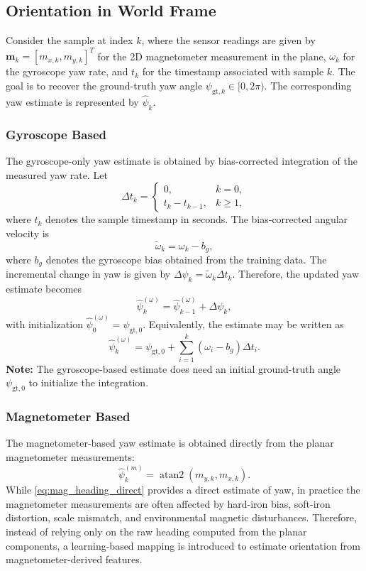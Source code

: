 \documentclass[subscriptcorrection,upint,varvw,barcolor=Goldenrod3,mathalfa=cal=euler,balance,hyphenate,pdf-a]{asmejour}
\begin{document}
\subsection{Orientation in World Frame}
Consider the sample at index $k$, where the sensor readings are given by $\mathbf{m}_k = [m_{x,k}, m_{y,k}]^T$ for the 2D magnetometer measurement in the plane, $\omega_k$ for the gyroscope yaw rate, and $t_k$ for the timestamp associated with sample $k$. The goal is to recover the ground-truth yaw angle $\psi_{\mathrm{gt},k} \in [0,2\pi)$. The corresponding yaw estimate is represented by $\hat{\psi}_k$.

\subsubsection{Gyroscope Based}
The gyroscope-only yaw estimate is obtained by bias-corrected integration of the measured yaw rate. Let
\begin{equation}
\Delta t_k =
\begin{cases}
0, & k=0,\\
t_k - t_{k-1}, & k\ge 1,
\end{cases}
\end{equation}
where \(t_k\) denotes the sample timestamp in seconds. The bias-corrected angular velocity is
\begin{equation}
\tilde{\omega}_k = \omega_k - b_g,
\end{equation}
where \(b_g\) denotes the gyroscope bias obtained from the training data. The incremental change in yaw is given by \(\Delta \psi_k = \tilde{\omega}_k \Delta t_k\).
Therefore, the updated yaw estimate becomes
\begin{equation}
\hat{\psi}^{(\omega)}_k
=
\hat{\psi}^{(\omega)}_{k-1} + \Delta \psi_k,
\end{equation}
with initialization $\hat{\psi}^{(\omega)}_0 = \psi_{\mathrm{gt},0}$.
Equivalently, the estimate may be written as
\begin{equation}
\hat{\psi}^{(\omega)}_k
=
\psi_{\mathrm{gt},0} + \sum_{i=1}^{k} (\omega_i - b_g)\Delta t_i.
\end{equation}
\textbf{Note:} The gyroscope-based estimate does need an initial ground-truth angle $\psi_{\mathrm{gt},0}$ to initialize the integration.

\subsubsection{Magnetometer Based}
The magnetometer-based yaw estimate is obtained directly from the planar magnetometer measurements:
\begin{equation}
\hat{\psi}_k^{(m)} = \operatorname{atan2}(m_{y,k}, m_{x,k}).
\label{eq:mag_heading_direct}
\end{equation}
While \eqref{eq:mag_heading_direct} provides a direct estimate of yaw, in practice the magnetometer measurements are often affected by hard-iron bias, soft-iron distortion, scale mismatch, and environmental magnetic disturbances. Therefore, instead of relying only on the raw heading computed from the planar components, a learning-based mapping is introduced to estimate orientation from magnetometer-derived features.
\end{document}

